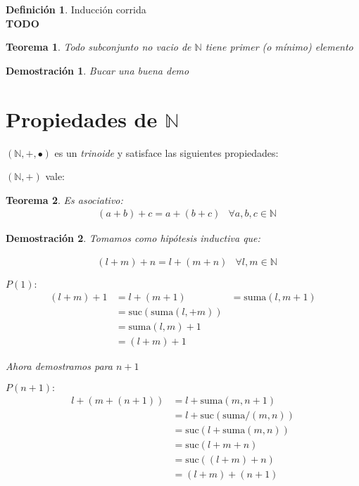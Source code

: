\documentclass[9pt,a4paper,draft]{article}
\theoremstyle{definition}
\newtheorem{defi}{Definición}
\theoremstyle{plain}
\newtheorem{teo}{Teorema}
\newtheorem{demo}{Demostración}[teo]
\begin{document}
\begin{defi} Inducción corrida \\ {\bfseries TODO}  \end{defi}

\begin{teo} \label{teobuenorden}Todo subconjunto no vacio de $\mathbb{N}$ tiene primer (o mínimo) elemento \end{teo}

\begin{demo}Bucar una buena demo\end{demo}

\section{Propiedades de $\mathbb{N}$}

$(\mathbb{N}, +, \bullet)$ es un {\itshape trinoide} y satisface las siguientes propiedades:

$(\mathbb{N}, +)$ vale:

\begin{teo} \label{teoasosum}Es asociativo:\\
\begin{align*} & (a+b)+c=a+(b+c) & \forall a,b,c\in{\mathbb{N}} \end{align*}
\end{teo}

\begin{demo} Tomamos como hipótesis inductiva que:

\begin{align*} & (l+m)+n=l+(m+n) & \forall l,m\in{\mathbb{N}}\end{align*}

$P(1):$
\begin{align*}
(l+m)+1 & = l+(m+1)
        & = \text{suma}(l,m+1) \\
        & = \text{suc}(\text{suma}(l,+m)) \\
        & = \text{suma}(l,m)+1 \\
        & = (l+m)+1 
\end{align*}

Ahora demostramos para $n+1$

$P(n+1):$
\begin{align*}
l+(m+(n+1)) & = l+\text{suma}(m, n+1) \\
            & = l+\text{suc}(\text{suma}/(m,n)) \\
            & = \text{suc}(l+\text{suma}(m,n)) \\
            & = \text{suc}(l+m+n) \\
            & = \text{suc}((l+m)+n) \\
            & = (l+m)+(n+1)
\end{align*}
\end{demo}
\end{document}
